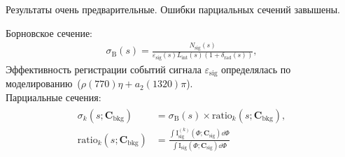 \documentclass{beamer}
\begin{document}
\begin{frame}
\begin{minipage}[t]{0.45\linewidth}
\begin{figure}
    \end{figure}
    \scriptsize
    Результаты очень предварительные. Ошибки парциальных сечений завышены.
  \end{minipage}
  \begin{minipage}[t]{0.54\linewidth}
    \scriptsize
    Борновское сечение:
    \begin{eqnarray*}
      \textstyle
      \sigma_{\text{B}}(s) =
      \frac{N_{\text{sig}}(s)}{\varepsilon_{\text{sig}}(s)L_{\text{int}}(s)(1 +
      \delta_{\text{rad}}(s))},
    \end{eqnarray*}
    Эффективность регистрации событий сигнала $\varepsilon_{\text{sig}}$ определялась по
    моделированию~($\rho(770)\eta + a_2(1320)\pi$).\\
    Парциальные сечения:
    \begin{eqnarray*}
      \textstyle
      \begin{split}
        \sigma_k(s; \bm{C}_{\text{bkg}}) &= \sigma_{\text{B}}(s) \times \text{ratio}_k(s;
        \bm{C}_{\text{bkg}}), \\
        \text{ratio}_{k}(s; \bm{C}_{\text{bkg}}) &= \frac{\int\text{I}^{(k)}_{\text{sig}}(\Phi;\bm{C}_{\text{sig}})\dd{\Phi}}{\int\text{I}_{\text{sig}}(\Phi;\bm{C}_{\text{sig}})\dd{\Phi}}
      \end{split}
      \end{eqnarray*}
  \end{minipage}
\end{frame}
\end{document}
